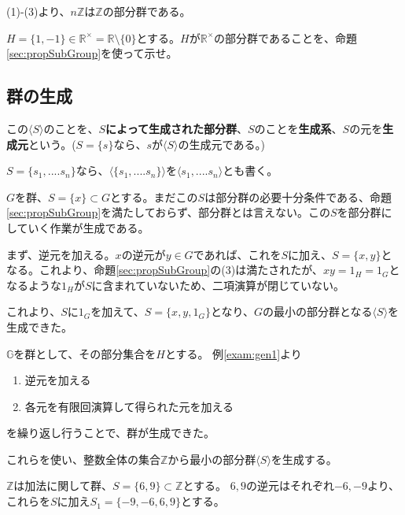 \documentclass[dvipdfmx,autodetect-engine]{jsarticle}
\begin{document}
(1)-(3)より、$n\mathbb{Z}$は$\mathbb{Z}$の部分群である。

\ques $H = \{1, -1\} \in \mathbb{R}^{\times} = \mathbb{R} \setminus \{0\}$とする。$H$が$\mathbb{R}^{\times}$の部分群であることを、命題\ref{sec:propSubGroup}を使って示せ。


\subsection{群の生成}

 この$\langle S \rangle$のことを、{\bf $S$によって生成された部分群}、$S$のことを{\bf 生成系}、$S$の元を{\bf 生成元}という。($S = \{s\}$なら、$s$が$\langle S \rangle$の生成元である。)

$S = \{s_{1}, .... s_{n}  \}$なら、$\langle \{s_{1}, .... s_{n}  \} \rangle$を$\langle s_{1}, .... s_{n} \rangle$とも書く。


$G$を群、$S = \{x\} \subset G$とする。まだこの$S$は部分群の必要十分条件である、命題\ref{sec:propSubGroup}を満たしておらず、部分群とは言えない。この$S$を部分群にしていく作業が生成である。

まず、逆元を加える。$x$の逆元が$y \in G$であれば、これを$S$に加え、$S = \{x, y\}$となる。これより、命題\ref{sec:propSubGroup}の(3)は満たされたが、$x y = 1_{H} = 1_{G}$となるような$1_{H}$が$S$に含まれていないため、二項演算が閉じていない。

これより、$S$に$1_{G}$を加えて、$S=\{x, y, 1_{G}\}$となり、$G$の最小の部分群となる$\langle S \rangle$を生成できた。


$\mathbb{G}$を群として、その部分集合を$H$とする。
例\ref{exam:gen1}より

\begin{enumerate}
\renewcommand{\labelenumi}{(\arabic{enumi})}
\item 逆元を加える
\item 各元を有限回演算して得られた元を加える
\end{enumerate}

を繰り返し行うことで、群が生成できた。

これらを使い、整数全体の集合$\mathbb{Z}$から最小の部分群$\langle S \rangle$を生成する。

$\mathbb{Z}$は加法に関して群、$S = \{6, 9\} \subset \mathbb{Z}$とする。
$6, 9$の逆元はそれぞれ$-6, -9$より、これらを$S$に加え$S_{1} = \{-9, -6, 6, 9\}$とする。
\end{document}
